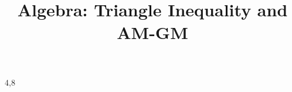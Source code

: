 \documentclass[a4paper,12pt]{article}
\begin{document}
\title{Algebra: Triangle Inequality and AM-GM}
\newcommand\event{S.3,4 Elite Mathematics Training}
\newcommand\learningobjective{
\item Learn Triangle Inequality and its usages
\item Learn AM-GM and its usage
}
\myfrontpage





\mynewpage


\mynewpage
\begin{question}[]{4,8}
    
    
    
    
    
    
    
    
    
    
    
     
\end{question}
\end{document}
